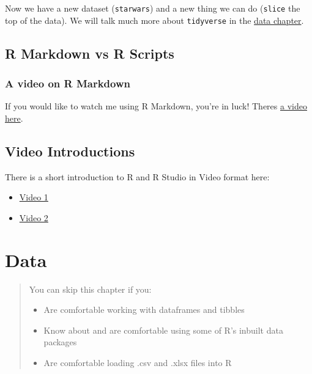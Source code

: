 \documentclass[
]{book}
\begin{document}
Now we have a new dataset (\texttt{starwars}) and a new thing we can do (\texttt{slice} the top of the data). We will talk much more about \texttt{tidyverse} in the \protect\hyperlink{data}{data chapter}.

\hypertarget{scripts_rmd}{%
\section{R Markdown vs R Scripts}\label{scripts_rmd}}

\hypertarget{video_rmd}{%
\subsection{A video on R Markdown}\label{video_rmd}}

If you would like to watch me using R Markdown, you're in luck! Theres \href{https://media.ed.ac.uk/media/R+ConversationsA+Intro+to+R+Markdown/1_td0q33v8/112983051}{a video here}.

\hypertarget{video_env}{%
\section{Video Introductions}\label{video_env}}

There is a short introduction to R and R Studio in Video format here:

\begin{itemize}
\item
  \href{https://media.ed.ac.uk/media/R+ConversationsA+Intro+to+R+Studio+1/1_aox3in51/112983051}{Video 1}
\item
  \href{https://media.ed.ac.uk/media/R+ConversationsA+Intro+to+R+Studio+2/1_vm1bylon}{Video 2}
\end{itemize}

\hypertarget{data}{%
\chapter{Data}\label{data}}

\begin{quote}
You can skip this chapter if you:

\begin{itemize}
\item
  Are comfortable working with dataframes and tibbles
\item
  Know about and are comfortable using some of R's inbuilt data packages
\item
  Are comfortable loading .csv and .xlsx files into R
\end{itemize}
\end{quote}
\end{document}
